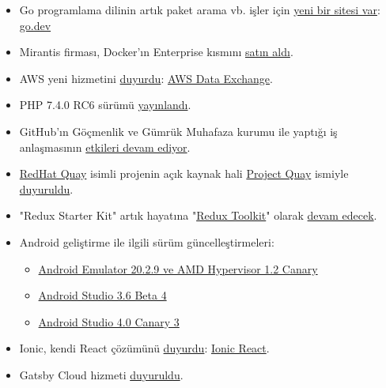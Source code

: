 \documentclass[11pt]{article}
\begin{document}
\begin{itemize}
\item Go programlama dilinin artık paket arama vb. işler için \href{https://blog.golang.org/go.dev}{yeni bir sitesi var}:
\href{https://go.dev/}{go.dev}
\item Mirantis firması, Docker'ın Enterprise kısmını \href{https://techcrunch.com/2019/11/13/mirantis-acquires-docker-enterprise/}{satın aldı}.
\item AWS yeni hizmetini \href{https://aws.amazon.com/tr/blogs/aws/aws-data-exchange-find-subscribe-to-and-use-data-products/}{duyurdu}: \href{https://aws.amazon.com/data-exchange/}{AWS Data Exchange}.
\item PHP 7.4.0 RC6 sürümü \href{https://news-web.php.net/php.internals/107792}{yayınlandı}.
\item GitHub'ın Göçmenlik ve Gümrük Muhafaza kurumu ile yaptığı iş anlaşmasının
\href{https://techcrunch.com/2019/11/13/github-faces-more-resignations-in-light-of-ice-contract/}{etkileri devam ediyor}.
\item \href{https://www.redhat.com/en/technologies/cloud-computing/quay}{RedHat Quay} isimli projenin açık kaynak hali \href{https://www.projectquay.io/}{Project Quay} ismiyle \href{https://www.redhat.com/en/blog/red-hat-introduces-open-source-project-quay-container-registry}{duyuruldu}.
\item "Redux Starter Kit" artık hayatına "\href{https://redux-toolkit.js.org/}{Redux Toolkit}" olarak \href{https://github.com/reduxjs/redux-toolkit/releases/tag/v1.0.4}{devam edecek}.
\item Android geliştirme ile ilgili sürüm güncelleştirmeleri:
\begin{itemize}
\item \href{https://androidstudio.googleblog.com/2019/11/emulator-2929-and-amd-hypervisor-12-to.html}{Android Emulator 20.2.9 ve AMD Hypervisor 1.2 Canary}
\item \href{https://androidstudio.googleblog.com/2019/11/android-studio-36-beta-4-available.html}{Android Studio 3.6 Beta 4}
\item \href{https://androidstudio.googleblog.com/2019/11/android-studio-40-canary-3-available.html}{Android Studio 4.0 Canary 3}
\end{itemize}
\item Ionic, kendi React çözümünü \href{https://ionicframework.com/blog/announcing-ionic-react/}{duyurdu}: \href{https://ionicframework.com/docs/react/overview}{Ionic React}.
\item Gatsby Cloud hizmeti \href{https://www.gatsbyjs.org/blog/2019-11-14-announcing-gatsby-cloud/}{duyuruldu}.

\end{itemize}
\end{document}
